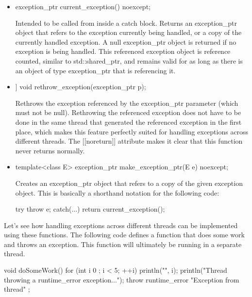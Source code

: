 \begin{itemize}
\item
\begin{cpp}
exception_ptr current_exception() noexcept;
\end{cpp}

Intended to be called from inside a catch block. Returns an exception\_ptr object that refers to the exception currently being handled, or a copy of the currently handled exception. A null exception\_ptr object is returned if no exception is being handled. This referenced exception object is reference counted, similar to std::shared\_ptr, and remains valid for as long as there is an object of type exception\_ptr that is referencing it.

\item
\begin{cpp}
[[noreturn]] void rethrow_exception(exception_ptr p);
\end{cpp}

Rethrows the exception referenced by the exception\_ptr parameter (which must not be null). Rethrowing the referenced exception does not have to be done in the same thread that generated the referenced exception in the first place, which makes this feature perfectly suited for handling exceptions across different threads. The [[noreturn]] attribute makes it clear that this function never returns normally.

\item
\begin{cpp}
template<class E> exception_ptr make_exception_ptr(E e) noexcept;
\end{cpp}

Creates an exception\_ptr object that refers to a copy of the given exception object. This is basically a shorthand notation for the following code:

\begin{cpp}
try { throw e; }
catch(...) { return current_exception(); }
\end{cpp}
\end{itemize}

Let’s see how handling exceptions across different threads can be implemented using these functions. The following code defines a function that does some work and throws an exception. This function will ultimately be running in a separate thread.

\begin{cpp}
void doSomeWork()
{
    for (int i { 0 }; i < 5; ++i) { println("{}", i); }
    println("Thread throwing a runtime_error exception...");
    throw runtime_error { "Exception from thread" };
}
\end{cpp}

